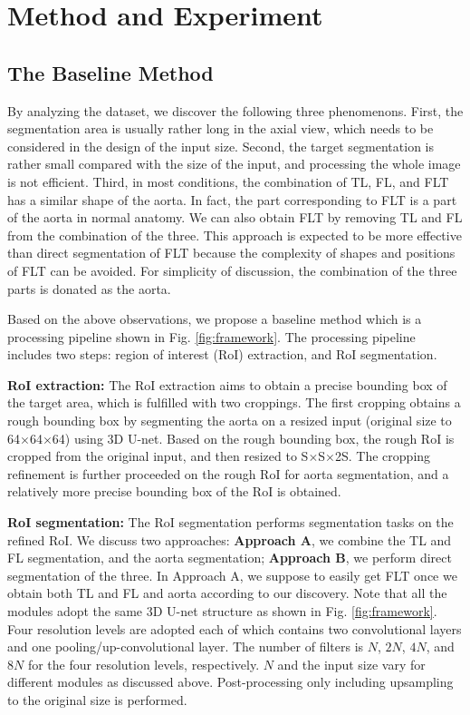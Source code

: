 \documentclass{article}
\begin{document}
\section{Method and Experiment}
\subsection{The Baseline Method}

By analyzing the dataset, we discover the following three phenomenons.
First, the segmentation area is usually rather long in the axial view, which needs to be considered in the design of the input size.
Second, the target segmentation is rather small compared with the size of the input, and processing the whole image is not efficient.
Third, in most conditions, the combination of TL, FL, and FLT has a similar shape of the aorta. 
In fact, the part corresponding to FLT is a part of the aorta in normal anatomy.
We can also obtain FLT by removing TL and FL from the combination of the three.
This approach is expected to be more effective than direct segmentation of FLT because the complexity of shapes and positions of FLT can be avoided.
For simplicity of discussion, the combination of the three parts is donated as the aorta.

Based on the above observations, we propose a baseline method which is a processing pipeline shown in Fig. \ref{fig:framework}.
The processing pipeline includes two steps: region of interest (RoI) extraction, and RoI segmentation.

\noindent\textbf{RoI extraction: } The RoI extraction aims to obtain a precise bounding box of the target area, which is fulfilled with two croppings.
The first cropping obtains a rough bounding box by segmenting the aorta on a resized input (original size to 64$\times$64$\times$64) using 3D U-net. 
Based on the rough bounding box, the rough RoI is cropped from the original input, and then resized to S$\times$S$\times$2S.
The cropping refinement is further proceeded on the rough RoI for aorta segmentation, and a relatively more precise bounding box of the RoI is obtained.

\noindent\textbf{RoI segmentation: } The RoI segmentation performs segmentation tasks on the refined RoI. 
We discuss two approaches: 
\textbf{Approach A}, we combine the TL and FL segmentation, and the aorta segmentation; 
\textbf{Approach B}, we perform direct segmentation of the three.
In Approach A, we suppose to easily get FLT once we obtain both TL and FL and aorta according to our discovery.
Note that all the modules adopt the same 3D U-net structure as shown in Fig. \ref{fig:framework}. 
Four resolution levels are adopted each of which contains two convolutional layers and one pooling/up-convolutional layer.
The number of filters is $N$, $2N$, $4N$, and $8N$ for the four resolution levels, respectively. 
$N$ and the input size vary for different modules as discussed above.
Post-processing only including upsampling to the original size is performed.
\end{document}

